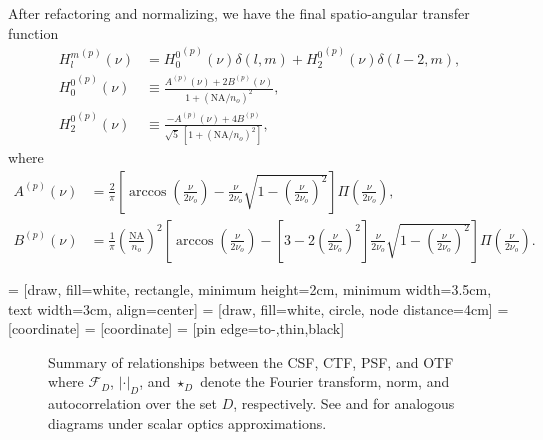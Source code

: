 \documentclass[11pt]{article}
\providecommand{\mb}[1]{\mathbf{#1}}
\providecommand{\ro}[1]{\mathbf{\mathbf{r}}_o}
\providecommand{\so}[1]{\mathbf{\hat{s}}_o}
\providecommand{\rd}[1]{\mathbf{r}_d}
\providecommand{\bs}[1]{\boldsymbol{#1}}
\begin{document}
After refactoring and normalizing, we have the final spatio-angular transfer function
\begin{align}
  {H_l^m}^{(p)}(\nu) &= {H_0^0}^{(p)}(\nu)\delta(l, m) + {H_2^0}^{(p)}(\nu)\delta(l-2, m),\\
  {H_0^0}^{(p)}(\nu) &\equiv \frac{A^{(p)}(\nu) + 2B^{(p)}(\nu)}{1 + (\text{NA}/n_o)^2},\\
  {H_2^0}^{(p)}(\nu) &\equiv \frac{-A^{(p)}(\nu) + 4B^{(p)}}{\sqrt{5}\, [1 + (\text{NA}/n_o)^2]},
\end{align}
where
\begin{align}
  {A}^{(p)}(\nu) &= \frac{2}{\pi}\left[\arccos\left(\frac{\nu}{2\nu_o}\right) - \frac{\nu}{2\nu_o}\sqrt{1 - \left(\frac{\nu}{2\nu_o}\right)^2}\right]\Pi\left(\frac{\nu}{2\nu_o}\right),\\
  B^{(p)}(\nu) &= \frac{1}{\pi}\left(\frac{\text{NA}}{n_o}\right)^2\left[\arccos\left(\frac{\nu}{2\nu_o}\right) - \left[3 - 2\left(\frac{\nu}{2\nu_o}\right)^2\right]\frac{\nu}{2\nu_o} \sqrt{1 - \left(\frac{\nu}{2\nu_o}\right)^2}\right]\Pi\left(\frac{\nu}{2\nu_o}\right).                 
\end{align}

 = [draw, fill=white, rectangle, 
    minimum height=2cm, minimum width=3.5cm, text width=3cm, align=center]
 = [draw, fill=white, circle, node distance=4cm]
 = [coordinate]
 = [coordinate]
 = [pin edge={to-,thin,black}]
\begin{figure}
      \centering
      \captionsetup{width=1.0\linewidth}
      \caption{Summary of relationships between the CSF, CTF, PSF, and OTF where
        $\mathcal{F}_D$, $|\cdot|_D$, and $\star_D$ denote the Fourier
        transform, norm, and autocorrelation over the set $D$, respectively. See
        \cite{goodman1996} and \cite{mertz2009} for analogous diagrams under
        scalar optics approximations.}
    \end{figure}
\end{document}
